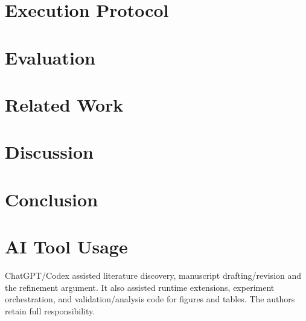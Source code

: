 \documentclass[conference,10pt]{IEEEtran}
\begin{document}
\section{Execution Protocol}\label{sec:protocol}


\section{Evaluation}\label{sec:eval}






\section{Related Work}\label{sec:related}

\section{Discussion}\label{sec:discussion}

\section{Conclusion}\label{sec:conclusion}

\section*{AI Tool Usage}
ChatGPT/Codex assisted literature discovery, manuscript drafting/revision
and the refinement argument. It also assisted runtime extensions,
experiment orchestration, and validation/analysis code for figures and
tables. The authors retain full responsibility.
\clearpage


\end{document}

